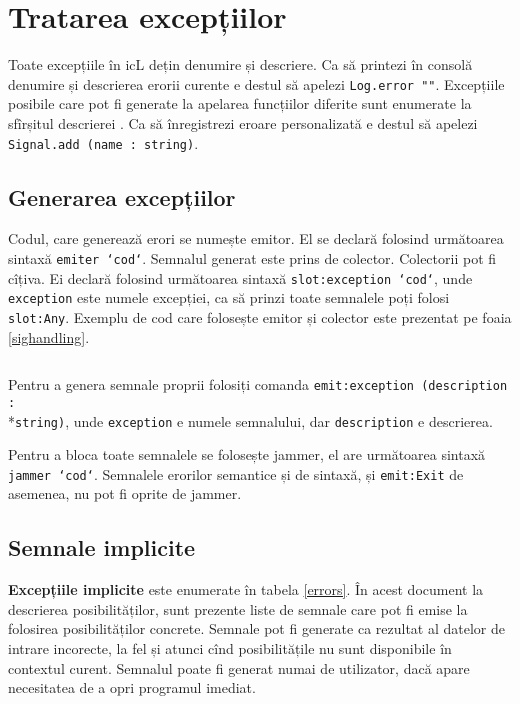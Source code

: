 \section{Tratarea excepțiilor}

Toate excepțiile în icL dețin denumire și descriere. Ca să printezi în consolă denumire și descrierea erorii curente e destul să apelezi \texttt{Log.error ""}. Excepțiile posibile care pot fi generate la apelarea funcțiilor diferite sunt enumerate la sfîrșitul descrierei . Ca să înregistrezi eroare personalizată e destul să apelezi \texttt{Signal.add (name : string)}.

\subsection{Generarea excepțiilor}

Codul, care generează erori se numește emitor. El se declară folosind următoarea sintaxă \texttt{emiter {`cod`}}. Semnalul generat este prins de colector. Colectorii pot fi cîțiva. Ei declară folosind următoarea sintaxă \texttt{slot:exception {`cod`}},
unde \texttt{exception} este numele excepției, ca să prinzi toate semnalele poți folosi \texttt{slot:Any}. Exemplu de cod care folosește emitor și colector este prezentat pe foaia \ref{sighandling}.

\begin{sourcecode}
    \label{sighandling}
    \inputminted[linenos]{icl}{../sources/sighandling.icL}
\end{sourcecode}

Pentru a genera semnale proprii folosiți comanda \texttt{emit:exception (description :}\\*\texttt{string)}, unde \texttt{exception} e numele semnalului, dar \texttt{description} e descrierea.

Pentru a bloca toate semnalele se folosește jammer, el are următoarea sintaxă \texttt{jammer {`cod`}}. Semnalele erorilor semantice și de sintaxă, și \texttt{emit:Exit} de asemenea, nu pot fi oprite de jammer.

\subsection{Semnale implicite}

{\bf Excepțiile implicite} este enumerate în tabela \ref{errors}. În acest document la descrierea posibilităților, sunt prezente liste de semnale care pot fi emise la folosirea posibilităților concrete. Semnale pot fi generate ca rezultat al datelor de intrare incorecte, la fel și atunci cînd posibilitățile nu sunt disponibile în contextul curent. Semnalul  poate fi generat numai de utilizator, dacă apare necesitatea de a opri programul imediat.

